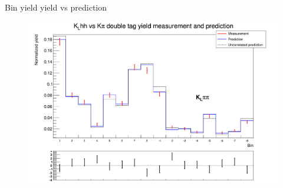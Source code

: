 \documentclass{beamer}
\begin{document}
\begin{frame}{Bin yield yield vs prediction}
  \begin{figure}
    \centering
    \includegraphics[width=\textwidth]{KLpipiVersusKpiYields.png}
  \end{figure}
\end{frame}
\end{document}
